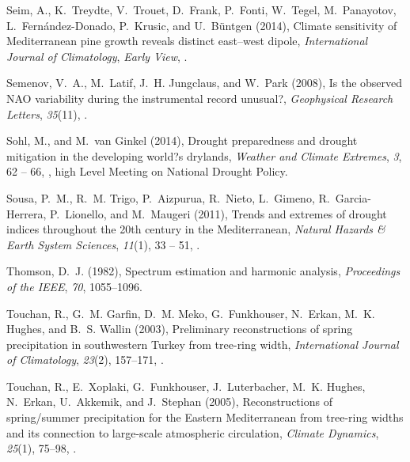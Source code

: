 \documentclass[draft,jgr]{AGUTeX}
\begin{document}
\begin{article}
\begin{thebibliography}{74}
Seim, A., K.~Treydte, V.~Trouet, D.~Frank, P.~Fonti, W.~Tegel, M.~Panayotov,
  L.~Fern{\'a}ndez-Donado, P.~Krusic, and U.~B{\"u}ntgen (2014), {Climate
  sensitivity of Mediterranean pine growth reveals distinct east--west dipole},
  \textit{International Journal of Climatology}, \textit{Early View},
  .

Semenov, V.~A., M.~Latif, J.~H. Jungclaus, and W.~Park (2008), {Is the observed
  {NAO} variability during the instrumental record unusual?},
  \textit{Geophysical Research Letters}, \textit{35}(11),
  .

Sohl, M., and M.~van Ginkel (2014), {Drought preparedness and drought
  mitigation in the developing world?s drylands}, \textit{Weather and Climate
  Extremes}, \textit{3}, 62 -- 66,
  , high Level Meeting on
  National Drought Policy.

Sousa, P.~M., R.~M. Trigo, P.~Aizpurua, R.~Nieto, L.~Gimeno, R.~Garcia-Herrera,
  P.~Lionello, and M.~Maugeri (2011), {Trends and extremes of drought indices
  throughout the 20th century in the Mediterranean}, \textit{Natural Hazards \&
  Earth System Sciences}, \textit{11}(1), 33 -- 51,
  .

Thomson, D.~J. (1982), {Spectrum estimation and harmonic analysis},
  \textit{Proceedings of the IEEE}, \textit{70}, 1055--1096.

Touchan, R., G.~M. Garfin, D.~M. Meko, G.~Funkhouser, N.~Erkan, M.~K. Hughes,
  and B.~S. Wallin (2003), {Preliminary reconstructions of spring precipitation
  in southwestern Turkey from tree-ring width}, \textit{International Journal
  of Climatology}, \textit{23}(2), 157--171, .

Touchan, R., E.~Xoplaki, G.~Funkhouser, J.~Luterbacher, M.~K. Hughes, N.~Erkan,
  U.~Akkemik, and J.~Stephan (2005), {Reconstructions of spring/summer
  precipitation for the Eastern Mediterranean from tree-ring widths and its
  connection to large-scale atmospheric circulation}, \textit{Climate
  Dynamics}, \textit{25}(1), 75--98, .


\end{thebibliography}
\end{article}
\end{document}
